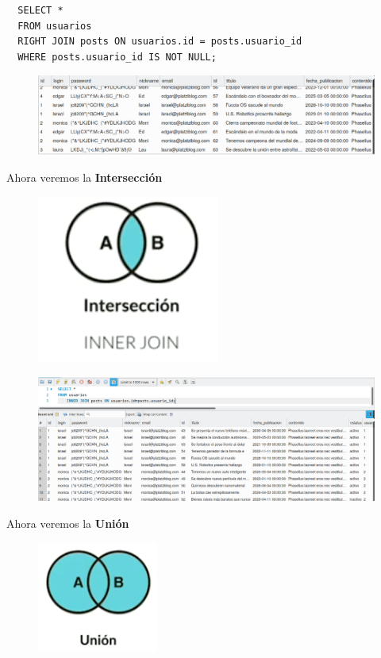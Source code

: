 \documentclass{article}
\begin{document}
\begin{verbatim}
  SELECT *
  FROM usuarios
  RIGHT JOIN posts ON usuarios.id = posts.usuario_id
  WHERE posts.usuario_id IS NOT NULL;
\end{verbatim}

\begin{figure}[h!]
  \centering
  \includegraphics[scale=0.75]{./Pictures/095_join_right_not_null.png}
\end{figure}

Ahora veremos la \textbf{Intersección}\\
\begin{figure}[h!]
  \centering
  \includegraphics[scale=0.75]{./Pictures/096_Interseccion.png}
\end{figure}

\begin{figure}[h!]
  \centering
  \includegraphics[scale=0.75]{./Pictures/099_inner.png}
\end{figure}


Ahora veremos la \textbf{Unión}

\begin{figure}[h!]
  \centering
  \includegraphics[scale=0.75]{./Pictures/097_union.png}
\end{figure}
\end{document}
